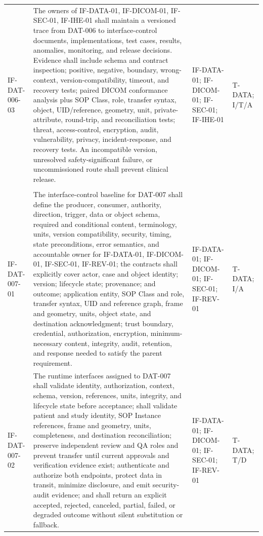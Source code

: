 \documentclass[11pt,letterpaper]{article}
\begin{document}
\begin{scriptsize}
\begin{longtable}{@{}L{0.14\textwidth}L{0.49\textwidth}L{0.19\textwidth}L{0.10\textwidth}@{}}
\addlinespace[2pt]
\mbox{IF-DAT-006-03} & The owners of IF-DATA-01, IF-DICOM-01, IF-SEC-01, IF-IHE-01 shall maintain a versioned trace from DAT-006 to interface-control documents, implementations, test cases, results, anomalies, monitoring, and release decisions. Evidence shall include schema and contract inspection; positive, negative, boundary, wrong-context, version-compatibility, timeout, and recovery tests; paired DICOM conformance analysis plus SOP Class, role, transfer syntax, object, UID\slash\allowbreak{}reference, geometry, unit, private-attribute, round-trip, and reconciliation tests; threat, access-control, encryption, audit, vulnerability, privacy, incident-response, and recovery tests. An incompatible version, unresolved safety-significant failure, or uncommissioned route shall prevent clinical release. & IF-DATA-01; IF-DICOM-01; IF-SEC-01; IF-IHE-01 & T-DATA; I\slash\allowbreak{}T\slash\allowbreak{}A \\
\addlinespace[2pt]
 \\
\addlinespace[2pt]
\mbox{IF-DAT-007-01} & The interface-control baseline for DAT-007 shall define the producer, consumer, authority, direction, trigger, data or object schema, required and conditional content, terminology, units, version compatibility, security, timing, state preconditions, error semantics, and accountable owner for IF-DATA-01, IF-DICOM-01, IF-SEC-01, IF-REV-01; the contracts shall explicitly cover actor, case and object identity; version; lifecycle state; provenance; and outcome; application entity, SOP Class and role, transfer syntax, UID and reference graph, frame and geometry, units, object state, and destination acknowledgment; trust boundary, credential, authorization, encryption, minimum-necessary content, integrity, audit, retention, and response needed to satisfy the parent requirement. & IF-DATA-01; IF-DICOM-01; IF-SEC-01; IF-REV-01 & T-DATA; I\slash\allowbreak{}A \\
\addlinespace[2pt]
\mbox{IF-DAT-007-02} & The runtime interfaces assigned to DAT-007 shall validate identity, authorization, context, schema, version, references, units, integrity, and lifecycle state before acceptance; shall validate patient and study identity, SOP Instance references, frame and geometry, units, completeness, and destination reconciliation; preserve independent review and QA roles and prevent transfer until current approvals and verification evidence exist; authenticate and authorize both endpoints, protect data in transit, minimize disclosure, and emit security-audit evidence; and shall return an explicit accepted, rejected, canceled, partial, failed, or degraded outcome without silent substitution or fallback. & IF-DATA-01; IF-DICOM-01; IF-SEC-01; IF-REV-01 & T-DATA; T\slash\allowbreak{}D \\

\end{longtable}
\end{scriptsize}
\end{document}
